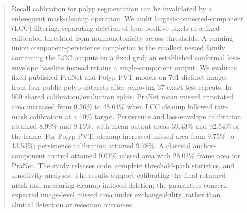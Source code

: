 \begin{abstract}
Recall calibration for polyp segmentation can be invalidated by a subsequent mask-cleanup operation. We audit largest-connected-component (LCC) filtering, separating deletion of true-positive pixels at a fixed calibrated threshold from nonmonotonicity across thresholds. A running-union component-persistence completion is the smallest nested family containing the LCC outputs on a fixed grid; an established conformal loss-envelope baseline instead retains a single-component output. We evaluate fixed published PraNet and Polyp-PVT models on 701 distinct images from four public polyp datasets after removing 37 exact test repeats. In 500 shared calibration/evaluation splits, PraNet mean missed annotated area increased from 9.36\% to 48.64\% when LCC cleanup followed raw-mask calibration at a 10\% target. Persistence and loss-envelope calibration attained 8.99\% and 9.16\%, with mean output areas 39.43\% and 92.54\% of the frame. For Polyp-PVT, cleanup increased missed area from 9.75\% to 13.53\%; persistence calibration attained 9.78\%. A classical anchor-component control attained 9.01\% missed area with 28.01\% frame area for PraNet. The study releases code, complete threshold-path statistics, and sensitivity analyses. The results support calibrating the final returned mask and measuring cleanup-induced deletion; the guarantees concern expected image-level missed area under exchangeability, rather than clinical detection or resection outcomes.
\end{abstract}
